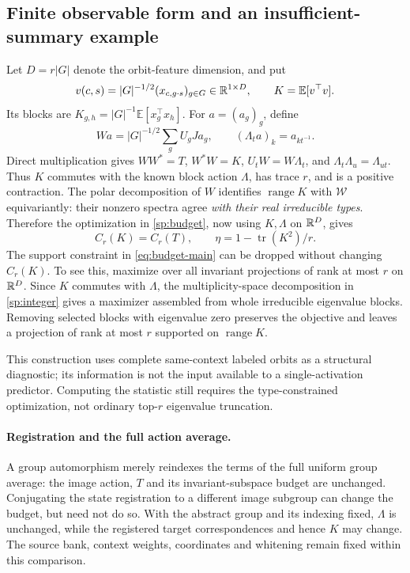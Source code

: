 \subsection{Finite observable form and an insufficient-summary example}
\label{sp:observable}
Let $D=r|G|$ denote the orbit-feature dimension, and put
\[
 v(c,s)
 =
 |G|^{-1/2}(x_{c,g\cdot s})_{g\in G}
 \in\mathbb{R}^{1\times D},
 \qquad
 K=\mathbb E[v^\top v].
\] Its blocks are $K_{g,h}=|G|^{-1}\mathbb E[x_g^\top x_h]$. For $a=(a_g)_g$, define
\[
 Wa=|G|^{-1/2}\sum_gU_gJa_g,\qquad (\Lambda_ta)_k=a_{kt^{-1}}.
\]
Direct multiplication gives $WW^*=T$, $W^*W=K$, $U_tW=W\Lambda_t$, and $\Lambda_t\Lambda_u=\Lambda_{ut}$. Thus $K$ commutes with the known block action $\Lambda$, has trace $r$, and is a positive contraction. The polar decomposition of $W$ identifies $\operatorname{range}K$ with $\mathcal W$ equivariantly: their nonzero spectra agree \emph{with their real irreducible types}. Therefore the optimization in \cref{sp:budget}, now using $K,\Lambda$ on $\mathbb{R}^D$, gives
\[
 C_r(K)=C_r(T),\qquad \eta=1-\operatorname{tr}(K^2)/r.
\]
The support constraint in \cref{eq:budget-main} can be dropped without changing $C_r(K)$. To see this, maximize over all invariant projections of rank at most $r$ on $\mathbb{R}^D$. Since $K$ commutes with $\Lambda$, the multiplicity-space decomposition in \cref{sp:integer} gives a maximizer assembled from whole irreducible eigenvalue blocks. Removing selected blocks with eigenvalue zero preserves the objective and leaves a projection of rank at most $r$ supported on $\operatorname{range}K$.

This construction uses complete same-context labeled orbits as a structural diagnostic; its information is not the input available to a single-activation predictor. Computing the statistic still requires the type-constrained optimization, not ordinary top-$r$ eigenvalue truncation.

\paragraph{Registration and the full action average.}
A group automorphism merely reindexes the terms of the full uniform group average: the image action, $T$ and its invariant-subspace budget are unchanged. Conjugating the state registration to a different image subgroup can change the budget, but need not do so. With the abstract group and its indexing fixed, $\Lambda$ is unchanged, while the registered target correspondences and hence $K$ may change. The source bank, context weights, coordinates and whitening remain fixed within this comparison.


